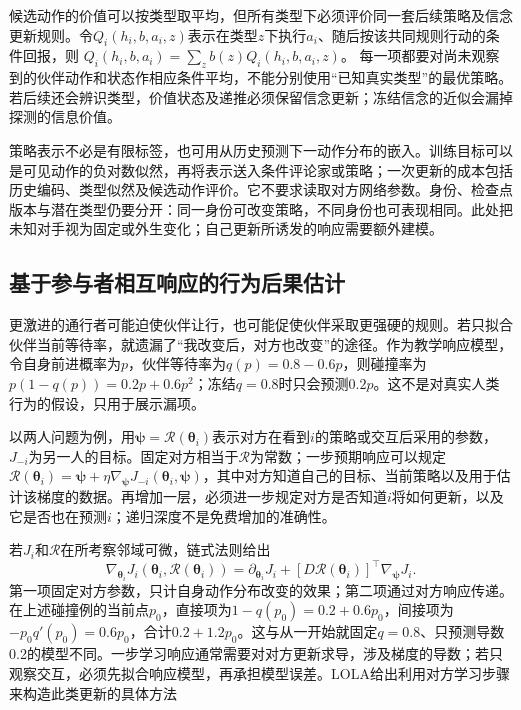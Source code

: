 候选动作的价值可以按类型取平均，但所有类型下必须评价同一套后续策略及信念更新规则。令$Q_i(h_i,b,a_i,z)$表示在类型$z$下执行$a_i$、随后按该共同规则行动的条件回报，则
$Q_i(h_i,b,a_i)=\sum_z b(z)Q_i(h_i,b,a_i,z)$。
每一项都要对尚未观察到的伙伴动作和状态作相应条件平均，不能分别使用“已知真实类型”的最优策略。若后续还会辨识类型，价值状态及递推必须保留信念更新；冻结信念的近似会漏掉探测的信息价值。

策略表示不必是有限标签，也可用从历史预测下一动作分布的嵌入。训练目标可以是可见动作的负对数似然，再将表示送入条件评论家或策略；一次更新的成本包括历史编码、类型似然及候选动作评价。它不要求读取对方网络参数。身份、检查点版本与潜在类型仍要分开：同一身份可改变策略，不同身份也可表现相同。此处把未知对手视为固定或外生变化；自己更新所诱发的响应需要额外建模。

\subsection{基于参与者相互响应的行为后果估计}
\label{sec:rl-multi-agent-response-model}

更激进的通行者可能迫使伙伴让行，也可能促使伙伴采取更强硬的规则。若只拟合伙伴当前等待率，就遗漏了“我改变后，对方也改变”的途径。作为教学响应模型，令自身前进概率为$p$，伙伴等待率为$q(p)=0.8-0.6p$，则碰撞率为$p(1-q(p))=0.2p+0.6p^2$；冻结$q=0.8$时只会预测$0.2p$。这不是对真实人类行为的假设，只用于展示漏项。

以两人问题为例，用$\bm\psi=\mathcal R(\bm\theta_i)$表示对方在看到$i$的策略或交互后采用的参数，$J_{-i}$为另一人的目标。固定对方相当于$\mathcal R$为常数；一步预期响应可以规定
$\mathcal R(\bm\theta_i)=\bm\psi+\eta\nabla_{\bm\psi}J_{-i}(\bm\theta_i,\bm\psi)$，其中对方知道自己的目标、当前策略以及用于估计该梯度的数据。再增加一层，必须进一步规定对方是否知道$i$将如何更新，以及它是否也在预测$i$；递归深度不是免费增加的准确性。

若$J_i$和$\mathcal R$在所考察邻域可微，链式法则给出
\begin{equation}
 \nabla_{\bm\theta_i}J_i(\bm\theta_i,\mathcal R(\bm\theta_i))
 =
 \partial_{\bm\theta_i}J_i+
 [D\mathcal R(\bm\theta_i)]^\top
       \nabla_{\bm\psi}J_i.
 \label{eq:rl-multi-agent-response-gradient}
\end{equation}
第一项固定对方参数，只计自身动作分布改变的效果；第二项通过对方响应传递。在上述碰撞例的当前点$p_0$，直接项为$1-q(p_0)=0.2+0.6p_0$，间接项为$-p_0q'(p_0)=0.6p_0$，合计$0.2+1.2p_0$。这与从一开始就固定$q=0.8$、只预测导数0.2的模型不同。一步学习响应通常需要对对方更新求导，涉及梯度的导数；若只观察交互，必须先拟合响应模型，再承担模型误差。LOLA给出利用对方学习步骤来构造此类更新的具体方法

